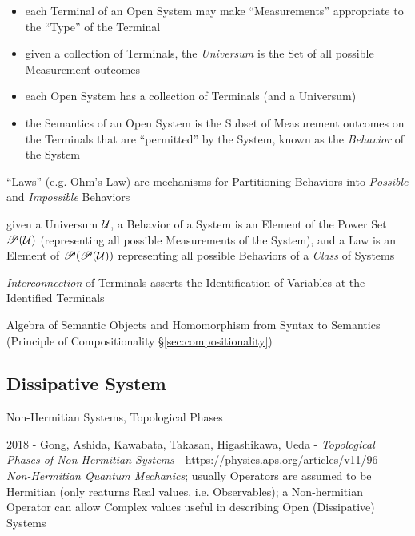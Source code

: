 \begin{itemize}
  \item each Terminal of an Open System may make ``Measurements''
    appropriate to the ``Type'' of the Terminal
  \item given a collection of Terminals, the \emph{Universum} is the
    Set of all possible Measurement outcomes
  \item each Open System has a collection of Terminals (and a Universum)
  \item the Semantics of an Open System is the Subset of Measurement
    outcomes on the Terminals that are ``permitted'' by the System,
    known as the \emph{Behavior} of the System
\end{itemize}


``Laws'' (e.g. Ohm's Law) are mechanisms for Partitioning Behaviors
into \emph{Possible} and \emph{Impossible} Behaviors

given a Universum $\mathcal{U}$, a Behavior of a System is an Element
of the Power Set $\mathscr{P}(\mathcal{U})$ (representing all possible
Measurements of the System), and a Law is an Element of
$\mathscr{P}(\mathscr{P}(\mathcal{U}))$ representing all possible Behaviors of a
\emph{Class} of Systems

\emph{Interconnection} of Terminals asserts the Identification of
Variables at the Identified Terminals

Algebra of Semantic Objects and Homomorphism from Syntax to Semantics
(Principle of Compositionality \S\ref{sec:compositionality})



\subsection{Dissipative System}\label{sec:dissipative_system}

Non-Hermitian Systems, Topological Phases

2018 - Gong, Ashida, Kawabata, Takasan, Higashikawa, Ueda -
\emph{Topological Phases of Non-Hermitian Systems} -
\url{https://physics.aps.org/articles/v11/96}
-- \emph{Non-Hermitian Quantum Mechanics}; usually Operators are assumed to be
Hermitian (only reaturns Real values, i.e. Observables); a Non-hermitian
Operator can allow Complex values useful in describing Open (Dissipative)
Systems


